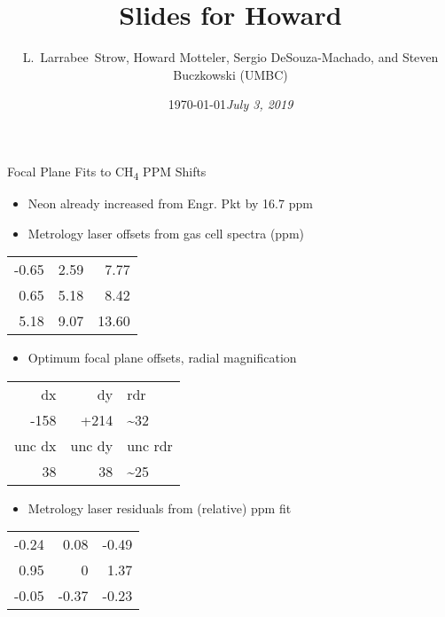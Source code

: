 \documentclass[10pt,t]{beamer}
\date{\today}
\title{Slides for Howard}
\date{\textit{\footnotesize July 3, 2019}}
\author{L.~Larrabee~Strow, Howard Motteler, Sergio DeSouza-Machado, and Steven Buczkowski (UMBC)}
\begin{document}
\maketitle

\begin{frame}[label={sec:org5725624}]{Focal Plane Fits to CH\textsubscript{4} PPM Shifts}
\begin{small}

\begin{itemize}
\item Neon already increased from Engr. Pkt by 16.7 ppm

\item Metrology laser offsets from gas cell spectra (ppm)
\end{itemize}
\begin{center}
\begin{tabular}{rrr}
-0.65 & 2.59 & 7.77\\
0.65 & 5.18 & 8.42\\
5.18 & 9.07 & 13.60\\
\end{tabular}
\end{center}

\begin{itemize}
\item Optimum focal plane offsets, radial magnification
\end{itemize}
\begin{center}
\begin{tabular}{rrl}
dx & dy & rdr\\
-158 & +214 & \textasciitilde{}32\\
\hline
unc   dx & unc   dy & unc rdr\\
38 & 38 & \textasciitilde{}25\\
\end{tabular}
\end{center}

\begin{itemize}
\item Metrology laser residuals from (relative) ppm fit
\end{itemize}
\begin{center}
\begin{tabular}{rrr}
-0.24 & 0.08 & -0.49\\
0.95 & 0 & 1.37\\
-0.05 & -0.37 & -0.23\\
\end{tabular}
\end{center}
\end{small}
\end{frame}
\end{document}
